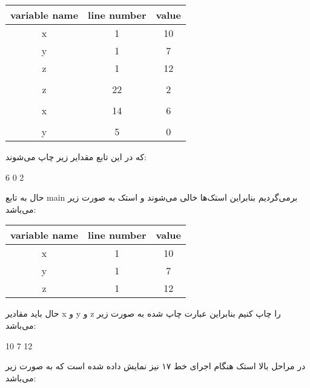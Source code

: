 \begin{latin}
	\begin{center}
		\begin{tabular}{|c|c|c|}
			\hline
			variable name & line number & value\\
			\hline
			x & 1 & 10\\
			\hline
			y & 1 & 7\\
			\hline
			z & 1 & 12\\
			\hline
			\rowcolor{black} \multicolumn{3}{|c|}{}\\
			\hline
			z & 22 & 2\\
			\hline
			\rowcolor{black} \multicolumn{3}{|c|}{}\\
			\hline
			x & 14 & 6\\
			\hline
			\rowcolor{black} \multicolumn{3}{|c|}{}\\
			\hline
			y & 5 & 0\\
			\hline
			
		\end{tabular}
	\end{center}
\end{latin}
که در این تابع مقدایر زیر چاپ می‌شوند:
\begin{center}
	\begin{latin}
		6 0 2
	\end{latin}
	
\end{center}
حال به تابع main برمی‌گردیم بنابراین استک‌ها خالی می‌شوند و استک به صورت زیر می‌باشد:
\begin{latin}
	\begin{center}
		\begin{tabular}{|c|c|c|}
			\hline
			variable name & line number & value\\
			\hline
			x & 1 & 10\\
			\hline
			y & 1 & 7\\
			\hline
			z & 1 & 12\\
			\hline
			
		\end{tabular}
	\end{center}
\end{latin}
حال باید مقادیر x و y و z را چاپ کنیم بنابراین عبارت چاپ شده به صورت زیر می‌باشد:
\begin{center}
	\begin{latin}
		10 7 12
	\end{latin}
	
\end{center}
در مراحل بالا استک هنگام اجرای خط ۱۷ نیز نمایش داده شده است که به صورت زیر می‌باشد:
